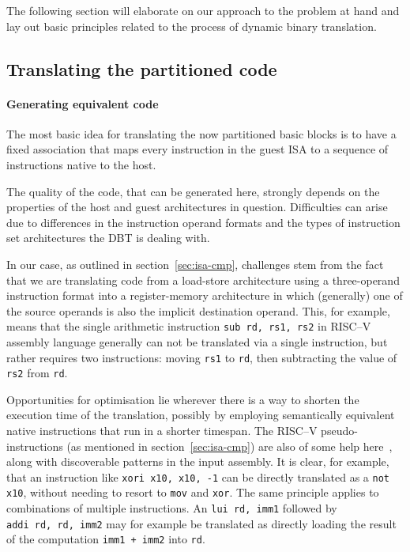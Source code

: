 The following section will elaborate on our approach to the problem at hand and lay out basic principles related to the process of dynamic binary translation.

\subsection{Translating the partitioned code}
\paragraph{Generating equivalent code} \mbox{}

\nopagebreak
The most basic idea for translating the now partitioned basic blocks is to have a fixed association that maps every instruction in the guest ISA to a sequence of instructions native to the host.

The quality of the code, that can be generated here, strongly depends on the properties of the host and guest architectures in question.
Difficulties can arise due to differences in the instruction operand formats and the types of instruction set architectures the DBT is dealing with.

In our case, as outlined in section~\ref{sec:isa-cmp}, challenges stem from the fact that we are translating code from a load-store architecture using a three-operand instruction format into a register-memory architecture in which (generally) one of the source operands is also the implicit destination operand.
This, for example, means that the single arithmetic instruction \texttt{sub~rd,~rs1,~rs2} in RISC--V assembly language generally can not be translated via a single instruction, but rather requires two instructions: moving \texttt{rs1} to \texttt{rd}, then subtracting the value of \texttt{rs2} from \texttt{rd}.

Opportunities for optimisation lie wherever there is a way to shorten the execution time of the translation, possibly by employing semantically equivalent native instructions that run in a shorter timespan.
The RISC--V pseudo-instructions (as mentioned in section~\ref{sec:isa-cmp}) are also of some help here~\cite[S. 139]{riscvspec}, along with discoverable patterns in the input assembly.
It is clear, for example, that an instruction like \texttt{xori~x10,~x10,~-1} can be directly translated as a \texttt{not x10}, without needing to resort to \texttt{mov} and \texttt{xor}.
The same principle applies to combinations of multiple instructions.
An \texttt{lui~rd,~imm1} followed by \texttt{addi~rd,~rd,~imm2} may for example be translated as directly loading the result of the computation \texttt{imm1~+~imm2} into \texttt{rd}.

